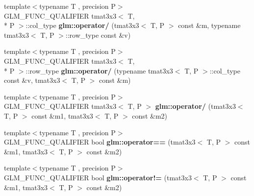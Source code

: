 \begin{DoxyCompactItemize}
\item 
\hypertarget{namespaceglm_ae0b7424ac335fe54c985e67c531176c0}{{\footnotesize template$<$typename T , precision P$>$ }\\G\-L\-M\-\_\-\-F\-U\-N\-C\-\_\-\-Q\-U\-A\-L\-I\-F\-I\-E\-R tmat3x3$<$ T, \\*
P $>$\-::col\-\_\-type {\bfseries glm\-::operator/} (tmat3x3$<$ T, P $>$ const \&m, typename tmat3x3$<$ T, P $>$\-::row\-\_\-type const \&v)}\label{namespaceglm_ae0b7424ac335fe54c985e67c531176c0}

\item 
\hypertarget{namespaceglm_a8c3f939040ea3ca3707ce7d0b36b9b91}{{\footnotesize template$<$typename T , precision P$>$ }\\G\-L\-M\-\_\-\-F\-U\-N\-C\-\_\-\-Q\-U\-A\-L\-I\-F\-I\-E\-R tmat3x3$<$ T, \\*
P $>$\-::row\-\_\-type {\bfseries glm\-::operator/} (typename tmat3x3$<$ T, P $>$\-::col\-\_\-type const \&v, tmat3x3$<$ T, P $>$ const \&m)}\label{namespaceglm_a8c3f939040ea3ca3707ce7d0b36b9b91}

\item 
\hypertarget{namespaceglm_a5671c0e99b001cb443a8f05a62985ccf}{{\footnotesize template$<$typename T , precision P$>$ }\\G\-L\-M\-\_\-\-F\-U\-N\-C\-\_\-\-Q\-U\-A\-L\-I\-F\-I\-E\-R tmat3x3$<$ T, P $>$ {\bfseries glm\-::operator/} (tmat3x3$<$ T, P $>$ const \&m1, tmat3x3$<$ T, P $>$ const \&m2)}\label{namespaceglm_a5671c0e99b001cb443a8f05a62985ccf}

\item 
\hypertarget{namespaceglm_aaa61456c0ed2eed3acbf27b2ab797dee}{{\footnotesize template$<$typename T , precision P$>$ }\\G\-L\-M\-\_\-\-F\-U\-N\-C\-\_\-\-Q\-U\-A\-L\-I\-F\-I\-E\-R bool {\bfseries glm\-::operator==} (tmat3x3$<$ T, P $>$ const \&m1, tmat3x3$<$ T, P $>$ const \&m2)}\label{namespaceglm_aaa61456c0ed2eed3acbf27b2ab797dee}

\item 
\hypertarget{namespaceglm_a14702a5f8ce75f873a43422e77b5c818}{{\footnotesize template$<$typename T , precision P$>$ }\\G\-L\-M\-\_\-\-F\-U\-N\-C\-\_\-\-Q\-U\-A\-L\-I\-F\-I\-E\-R bool {\bfseries glm\-::operator!=} (tmat3x3$<$ T, P $>$ const \&m1, tmat3x3$<$ T, P $>$ const \&m2)}\label{namespaceglm_a14702a5f8ce75f873a43422e77b5c818}

\end{DoxyCompactItemize}


